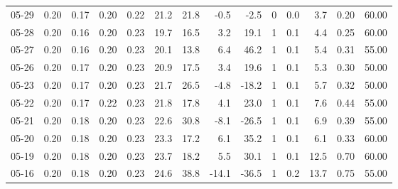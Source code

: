 \begin{threeparttable}
{\begin{tabular}{lrrrrrrrrrrrrr}
  05-29 &          0.20 &          0.17 &          0.20 &        0.22 &                21.2 &                21.8 &       -0.5 &         -2.5 &              0 &                 0.0 &              3.7 &            0.20 &                  60.00 \\
  05-28 &          0.20 &          0.16 &          0.20 &        0.23 &                19.7 &                16.5 &        3.2 &         19.1 &              1 &                 0.1 &              4.4 &            0.25 &                  60.00 \\
  05-27 &          0.20 &          0.16 &          0.20 &        0.23 &                20.1 &                13.8 &        6.4 &         46.2 &              1 &                 0.1 &              5.4 &            0.31 &                  55.00 \\
  05-26 &          0.20 &          0.17 &          0.20 &        0.23 &                20.9 &                17.5 &        3.4 &         19.6 &              1 &                 0.1 &              5.3 &            0.30 &                  50.00 \\
  05-23 &          0.20 &          0.17 &          0.20 &        0.23 &                21.7 &                26.5 &       -4.8 &        -18.2 &              1 &                 0.1 &              5.7 &            0.32 &                  50.00 \\
  05-22 &          0.20 &          0.17 &          0.22 &        0.23 &                21.8 &                17.8 &        4.1 &         23.0 &              1 &                 0.1 &              7.6 &            0.44 &                  55.00 \\
  05-21 &          0.20 &          0.18 &          0.20 &        0.23 &                22.6 &                30.8 &       -8.1 &        -26.5 &              1 &                 0.1 &              6.9 &            0.39 &                  55.00 \\
  05-20 &          0.20 &          0.18 &          0.20 &        0.23 &                23.3 &                17.2 &        6.1 &         35.2 &              1 &                 0.1 &              6.1 &            0.33 &                  60.00 \\
  05-19 &          0.20 &          0.18 &          0.20 &        0.23 &                23.7 &                18.2 &        5.5 &         30.1 &              1 &                 0.1 &             12.5 &            0.70 &                  60.00 \\
  05-16 &          0.20 &          0.18 &          0.20 &        0.23 &                24.6 &                38.8 &      -14.1 &        -36.5 &              1 &                 0.2 &             13.7 &            0.75 &                  55.00 \\

\end{tabular}}
\end{threeparttable}
